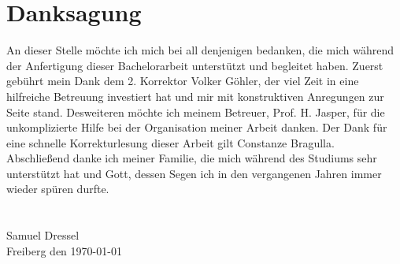 \documentclass[doktyp=barbeit, sprache=german]{TUBAFarbeiten}
\begin{document}
\maketitle
\TUBAFErklaerungsseite
\section*{Danksagung}
\thispagestyle{empty}
An dieser Stelle möchte ich mich bei all denjenigen bedanken, die mich während der Anfertigung dieser Bachelorarbeit unterstützt und begleitet haben. Zuerst gebührt mein Dank dem 2. Korrektor Volker Göhler, der viel Zeit in eine hilfreiche Betreuung investiert hat und mir mit konstruktiven Anregungen zur Seite stand. Desweiteren möchte ich meinem Betreuer, Prof. H. Jasper, für die unkomplizierte Hilfe bei der Organisation meiner Arbeit danken. Der Dank für eine schnelle Korrekturlesung dieser Arbeit gilt Constanze Bragulla.
\\Abschließend danke ich meiner Familie, die mich während des Studiums sehr unterstützt hat und Gott, dessen Segen ich in den vergangenen Jahren immer wieder spüren durfte.
\\\\\\Samuel Dressel
\\Freiberg den \today
\newpage
\tableofcontents
\newpage
\end{document}
